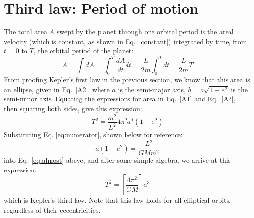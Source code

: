 \documentclass[11pt]{article}
\begin{document}
\section{Third law: Period of motion}
The total area $A$ swept by the planet through one orbital period is the areal
velocity (which is constant, as shown in Eq.\ \ref{constant}) integrated by
time, from $t=0$ to $T$, the orbital period of the planet:
\begin{equation}
  A=\int dA=\int_0^T\frac{dA}{dt}dt=\frac{L}{2m}\int_0^Tdt=\frac{L}{2m}T
  \label{A1}
\end{equation}
From proofing Kepler's first law in the previous section, we know that this
area is an ellipse, given in Eq.~\ref{A2}.
where $a$ is the semi-major axis, $b=a\sqrt{1-e^2}$ is the semi-minor axis.
Equating the expressions for area in Eq.\ \ref{A1} and Eq.\ \ref{A2}, then
squaring both sides, give this expression:
\begin{equation}
  T^2=\frac{m^2}{L^2}4\pi^2a^4(1-e^2)
  \label{eq:almost}
\end{equation}
Substituting Eq. \ref{eq:numerator}, shown below for reference:
\begin{displaymath}
  a(1-e^2)=\frac{L^2}{GMm^2}
\end{displaymath}
into Eq.\ \ref{eq:almost} above, and after some simple algebra, we arrive at
this expression:
\begin{equation}
  \boxed{T^2=\left[\frac{4\pi^2}{GM}\right] a^3}
\end{equation}
which is Kepler's third law. Note that this law holds for all elliptical
orbits, regardless of their eccentricities.
\end{document}
